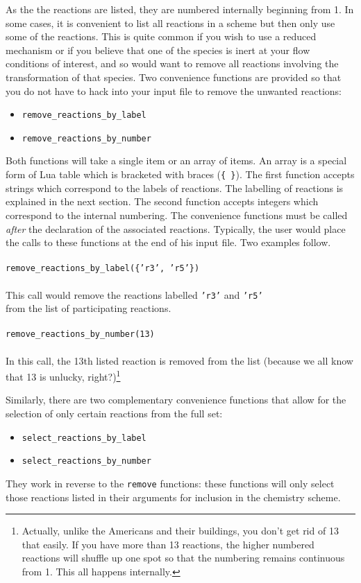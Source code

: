 As the the reactions are listed, they are numbered internally beginning from 1.
In some cases, it is convenient to list all reactions in a scheme but then 
only use some of the reactions.
This is quite common if you wish to use a reduced mechanism or if you believe
that one of the species is inert at your flow conditions of interest, and
so would want to remove all reactions involving the transformation of that species.
Two convenience functions are provided so that you do not have to 
hack into your input file to remove the unwanted reactions:
\begin{itemize}
 \item \texttt{remove\_reactions\_by\_label}
 \item \texttt{remove\_reactions\_by\_number}
\end{itemize}
Both functions will take a single item or an array of items.
An array is a special form of Lua table which is bracketed
with braces (\texttt{\{ \}}).
The first function accepts strings which correspond to the labels
of reactions.
The labelling of reactions is explained in the next section.
The second function accepts integers which correspond to the
internal numbering.
The convenience functions must be called \emph{after} the declaration
of the associated reactions.
Typically, the user would place the calls to these functions at the end of his input
file.
Two examples follow.\\
%
\topbar\\
\texttt{remove\_reactions\_by\_label(\{'r3', 'r5'\})}\\
\bottombar\\
This call would remove the reactions labelled \texttt{'r3'} and \texttt{'r5'}\\
from the list of participating reactions.\\
\topbar\\
\texttt{remove\_reactions\_by\_number(13)}\\
\bottombar\\
In this call, the 13th listed reaction is removed from the list (because
we all know that 13 is unlucky, right?)\footnote{Actually, unlike the Americans and their buildings, you don't get rid of 13 that easily.
If you have more than 13 reactions, the higher numbered reactions will shuffle up one spot
so that the numbering remains continuous from 1.  This all happens internally.}

Similarly, there are two complementary convenience functions that allow for the selection
of only certain reactions from the full set:
\begin{itemize}
 \item \texttt{select\_reactions\_by\_label}
 \item \texttt{select\_reactions\_by\_number}
\end{itemize}
They work in reverse to the \texttt{remove} functions: these functions
will only select those reactions listed in their arguments for inclusion in the chemistry scheme.

